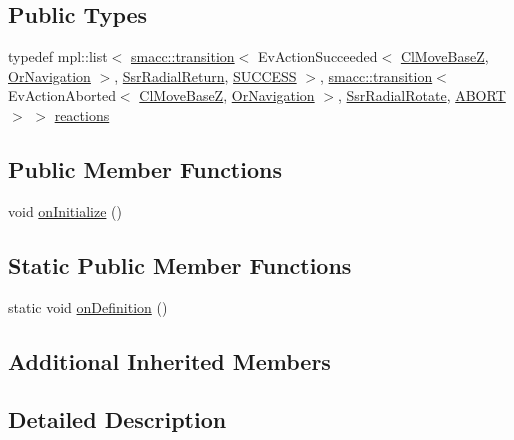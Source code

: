 \subsection*{Public Types}
\begin{DoxyCompactItemize}
\item 
typedef mpl\+::list$<$ \hyperlink{classsmacc_1_1transition}{smacc\+::transition}$<$ Ev\+Action\+Succeeded$<$ \hyperlink{classmove__base__z__client_1_1ClMoveBaseZ}{Cl\+Move\+BaseZ}, \hyperlink{classsm__dance__bot_1_1OrNavigation}{Or\+Navigation} $>$, \hyperlink{structsm__dance__bot_1_1radial__motion_1_1SsrRadialReturn}{Ssr\+Radial\+Return}, \hyperlink{classSUCCESS}{S\+U\+C\+C\+E\+SS} $>$, \hyperlink{classsmacc_1_1transition}{smacc\+::transition}$<$ Ev\+Action\+Aborted$<$ \hyperlink{classmove__base__z__client_1_1ClMoveBaseZ}{Cl\+Move\+BaseZ}, \hyperlink{classsm__dance__bot_1_1OrNavigation}{Or\+Navigation} $>$, \hyperlink{structsm__dance__bot_1_1radial__motion_1_1SsrRadialRotate}{Ssr\+Radial\+Rotate}, \hyperlink{classABORT}{A\+B\+O\+RT} $>$ $>$ \hyperlink{structsm__dance__bot_1_1radial__motion_1_1SsrRadialEndPoint_a6cabf1e70ef0fe694abadf6f2af1675e}{reactions}
\end{DoxyCompactItemize}
\subsection*{Public Member Functions}
\begin{DoxyCompactItemize}
\item 
void \hyperlink{structsm__dance__bot_1_1radial__motion_1_1SsrRadialEndPoint_a9bd83e7c550645e7b0c1377d7cafd636}{on\+Initialize} ()
\end{DoxyCompactItemize}
\subsection*{Static Public Member Functions}
\begin{DoxyCompactItemize}
\item 
static void \hyperlink{structsm__dance__bot_1_1radial__motion_1_1SsrRadialEndPoint_af965b12019c568cded855e839514c83f}{on\+Definition} ()
\end{DoxyCompactItemize}
\subsection*{Additional Inherited Members}


\subsection{Detailed Description}


